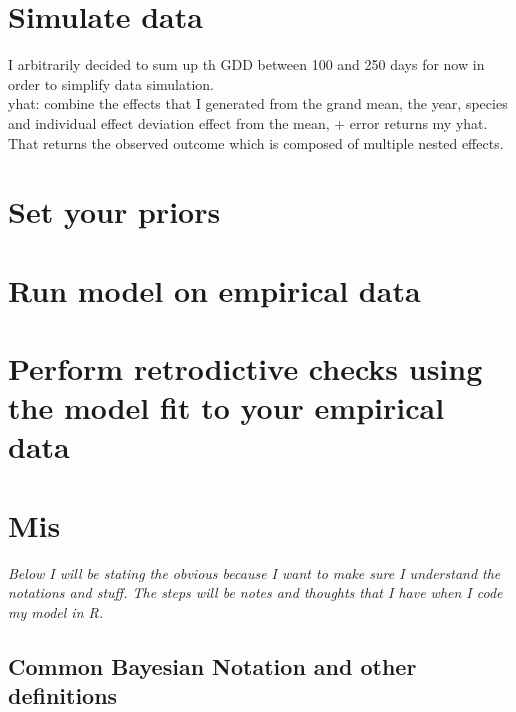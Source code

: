 \documentclass[a4paper,12pt]{article}
\begin{document}
\section{Simulate data}
I arbitrarily decided to sum up th GDD between 100 and 250 days for now in order to simplify data simulation. \\
yhat: combine the effects that I generated from the grand mean, the year, species and individual effect deviation effect from the mean, + error returns my yhat. That returns the observed outcome which is composed of multiple nested effects. 

\section{Set your priors}

\section{Run model on empirical data}

\section{Perform retrodictive checks using the model fit to your empirical data}

\section{Mis}

\newpage
\textit{Below I will be stating the obvious because I want to make sure I understand the notations and stuff. The steps will be notes and thoughts that I have when I code my model in R.}

\subsection*{Common Bayesian Notation and other definitions} %
\end{document}
